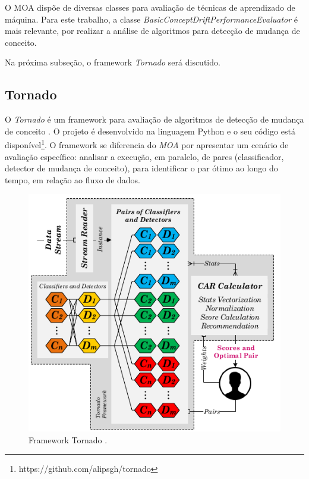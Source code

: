\documentclass[qual, classic, a4paper]{ufbathesis}
\begin{document}
O MOA dispõe de diversas classes para avaliação de técnicas de aprendizado de máquina. 
Para este trabalho, a classe \textit{BasicConceptDriftPerformanceEvaluator} é mais relevante, por realizar a análise de  algoritmos para detecção de mudança de conceito.

Na próxima subseção, o framework \textit{Tornado} será discutido.

\subsection{Tornado}

O \textit{Tornado} é um framework para avaliação de algoritmos de detecção de mudança de conceito \cite{Pesaranghader:Tornado}.
O projeto é desenvolvido na linguagem Python e o seu código está disponível\footnote{https://github.com/alipsgh/tornado}.
O framework se diferencia do \textit{MOA} por apresentar um cenário de avaliação específico: 
analisar a execução, em paralelo, de pares (classificador, detector de mudança de conceito), 
para identificar o par ótimo ao longo do tempo, em relação ao fluxo de dados.

\begin{figure}[H]
\begin{center}
    \includegraphics[scale=0.75]{imagens/tornado.png}
    \caption{Framework Tornado \cite{Pesaranghader:Tornado}.}
    \label{fig:tornado}
\end{center}
\end{figure}
\end{document}
